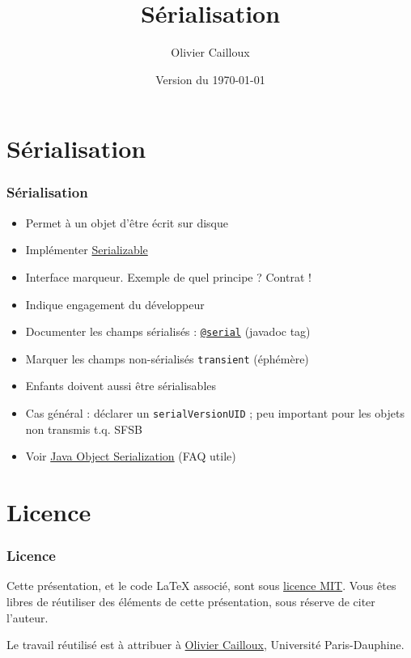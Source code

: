 \documentclass[english, french]{beamer}
\title{Sérialisation}
\author{Olivier Cailloux}
\institute[LAMSADE]{LAMSADE, Université Paris-Dauphine}
\date{Version du \today}
\begin{document}


\begin{frame}[plain]
   \titlepage
\end{frame}
\addtocounter{framenumber}{-1}

\section{Sérialisation}
\begin{frame}
	\frametitle{Sérialisation}
	\begin{itemize}
		\item Permet à un objet d’être écrit sur disque
		\item Implémenter \href{http://docs.oracle.com/javase/8/docs/api/java/io/Serializable.html}{Serializable}
		\item Interface marqueur. Exemple de quel principe ? \pause Contrat !
		\item Indique engagement du développeur \pause
		\item Documenter les champs sérialisés : \href{http://docs.oracle.com/javase/1.5.0/docs/tooldocs/windows/javadoc.html@serial}{\texttt{@serial}} (javadoc tag)
		\item Marquer les champs non-sérialisés \texttt{transient} (éphémère)
		\item Enfants doivent aussi être sérialisables
		\item {\tiny Cas général : déclarer un \texttt{serialVersionUID} ; peu important pour les objets non transmis t.q. SFSB}
		\item Voir \href{https://docs.oracle.com/javase/8/docs/technotes/guides/serialization/index.html}{Java Object Serialization} (FAQ utile)
	\end{itemize}
\end{frame}

\appendix
\section{Licence}
\begin{frame}
	\frametitle{Licence}
	Cette présentation, et le code LaTeX associé, sont sous \href{https://opensource.org/licenses/MIT}{licence MIT}. Vous êtes libres de réutiliser des éléments de cette présentation, sous réserve de citer l’auteur.
	
	Le travail réutilisé est à attribuer à \href{http://www.lamsade.dauphine.fr/~ocailloux/}{Olivier Cailloux}, Université Paris-Dauphine.
\end{frame}
\end{document}

